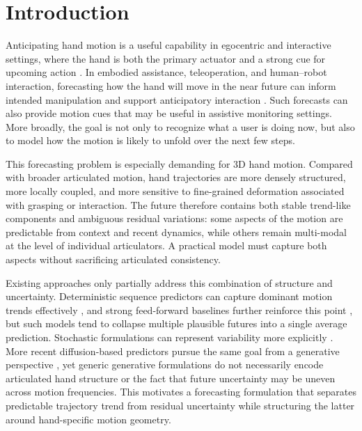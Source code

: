 \section{Introduction}

Anticipating hand motion is a useful capability in egocentric and interactive settings, where the hand is both the primary actuator \cite{GarciaHernando2018FirstPerson} and a strong cue for upcoming action \cite{Liu2022Hotspots,Hatano2025EgoH4}. In embodied assistance, teleoperation, and human--robot interaction, forecasting how the hand will move in the near future can inform intended manipulation and support anticipatory interaction \cite{Kothari2023ConstrainedHRCMotionPrediction,Heman2026TeleoperationIntent}. Such forecasts can also provide motion cues that may be useful in assistive monitoring settings. More broadly, the goal is not only to recognize what a user is doing now, but also to model how the motion is likely to unfold over the next few steps.

This forecasting problem is especially demanding for 3D hand motion. Compared with broader articulated motion, hand trajectories are more densely structured, more locally coupled, and more sensitive to fine-grained deformation associated with grasping or interaction. The future therefore contains both stable trend-like components and ambiguous residual variations: some aspects of the motion are predictable from context and recent dynamics, while others remain multi-modal at the level of individual articulators. A practical model must capture both aspects without sacrificing articulated consistency.

Existing approaches only partially address this combination of structure and uncertainty. Deterministic sequence predictors can capture dominant motion trends effectively \cite{Martinez2017RNN,Mao2020HistoryRepeats,Dang2021MSRGCN}, and strong feed-forward baselines further reinforce this point \cite{Guo2023SiMLPe}, but such models tend to collapse multiple plausible futures into a single average prediction. Stochastic formulations can represent variability more explicitly \cite{Yuan2020DLow,aliakbarian2020stochastic,Chen2023HumanMAC}. More recent diffusion-based predictors pursue the same goal from a generative perspective \cite{Sun2024CoMusion,Tang2024PromptFDDM}, yet generic generative formulations do not necessarily encode articulated hand structure or the fact that future uncertainty may be uneven across motion frequencies. This motivates a forecasting formulation that separates predictable trajectory trend from residual uncertainty while structuring the latter around hand-specific motion geometry.

